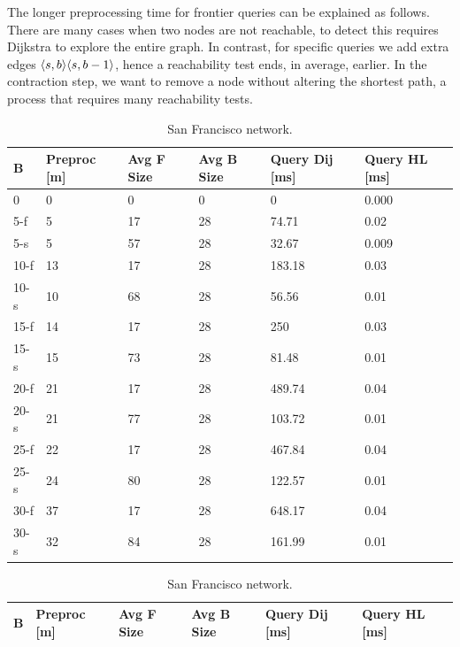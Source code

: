 The longer preprocessing time for frontier queries can be explained as follows.
There are many cases when two nodes are not reachable, to detect this requires Dijkstra to explore the entire graph.
In contrast, for specific queries we add extra edges $\langle s,b\rangle\langle s,b-1\rangle$, hence a reachability test ends, in average, earlier.
In the contraction step, we want to remove a node without altering the shortest path, a process that requires many reachability tests.

\begin{table}
\begin{subtable}{.5\textwidth}
\begin{center}
\begin{tabular}{ | l | p{1cm} | p{1cm} | p{1cm} | p{1.2cm} | p{1.2cm} | }
\hline
	B & Preproc [m] & Avg F Size & Avg B Size & Query Dij [ms] & Query HL [ms] \\ \hline \hline
	0 & 0 & 0 & 0 & 0 & 0.000 \\ \hline
5-f  & 5  & 17 & 28 & 74.71  & 0.02  \\
5-s  & 5  & 57 & 28 & 32.67  & 0.009 \\\hline
10-f & 13 & 17 & 28 & 183.18 & 0.03  \\
10-s & 10 & 68 & 28 & 56.56  & 0.01  \\\hline
15-f & 14 & 17 & 28 & 250    & 0.03  \\
15-s & 15 & 73 & 28 & 81.48  & 0.01  \\\hline
20-f & 21 & 17 & 28 & 489.74 & 0.04  \\
20-s & 21 & 77 & 28 & 103.72 & 0.01  \\\hline
25-f & 22 & 17 & 28 & 467.84 & 0.04  \\
25-s & 24 & 80 & 28 & 122.57 & 0.01  \\\hline
30-f & 37 & 17 & 28 & 648.17 & 0.04  \\
30-s & 32 & 84 & 28 & 161.99 & 0.01  \\\hline
\end{tabular}
\caption{San Francisco network.}\label{tab:sf_results}
\end{center}
\end{subtable}
\begin{subtable}{.5\textwidth}
\begin{center}
\begin{tabular}{ | l | p{1cm} | p{1cm} | p{1cm} | p{1.2cm} | p{1.2cm} |}
\hline
	B & Preproc  [m] & Avg F Size & Avg B Size & Query Dij [ms] & Query HL [ms] \\ \hline \hline

\end{tabular}
\end{center}
\end{subtable}
\end{table}
